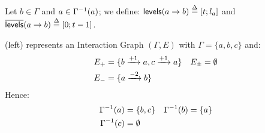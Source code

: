 
\begin{definition}\label{def:levels}
Let $b \in \Gamma$ and $a \in \Gamma^{-1}(a)$;
we define: $\mathsf{levels}(a\rightarrow b) \stackrel{\Delta}= [t; l_a]$ and $\overline{\mathsf{levels}}(a\rightarrow b) \stackrel{\Delta}= [0; t-1]$.
\end{definition}

\begin{example*}
(left) represents an Interaction Graph $(\Gamma,E)$ with
$\Gamma = \{a, b, c\}$ and:
\begin{align*}
  E_+ &= \{b \xrightarrow{+ 1} a, c \xrightarrow{+ 1} a\} &
  E_\pm &= \emptyset \\
  E_- &= \{a \xrightarrow{- 2} b\}
\end{align*}
Hence:
\begin{align*}
  \Gamma^{-1}(a) &= \{ b, c \} &
  \Gamma^{-1}(b) &= \{ a \} \\
  \Gamma^{-1}(c) &= \emptyset
\end{align*}
\end{example*}

